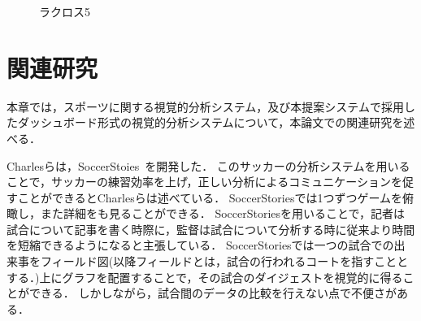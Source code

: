 \documentclass[sotsuron]{kuee}
\begin{document}
		\begin{figure}
			\begin{center}
			\end{center}
			\caption{ラクロス5}
	  		\label{fig:lax005}
		\end{figure}

\chapter{関連研究}
	本章では，スポーツに関する視覚的分析システム，及び本提案システムで採用したダッシュボード形式の視覚的分析システムについて，本論文での関連研究を述べる．
	
	Charlesらは，SoccerStoies~\cite{SoccerStory}を開発した．
	このサッカーの分析システムを用いることで，サッカーの練習効率を上げ，正しい分析によるコミュニケーションを促すことができるとCharlesらは述べている．
	SoccerStoriesでは1つずつゲームを俯瞰し，また詳細をも見ることができる．
	SoccerStoriesを用いることで，記者は試合について記事を書く時際に，監督は試合について分析する時に従来より時間を短縮できるようになると主張している．
	SoccerStoriesでは一つの試合での出来事をフィールド図(以降フィールドとは，試合の行われるコートを指すこととする．)上にグラフを配置することで，その試合のダイジェストを視覚的に得ることができる．
	しかしながら，試合間のデータの比較を行えない点で不便さがある．
	
\end{document}
